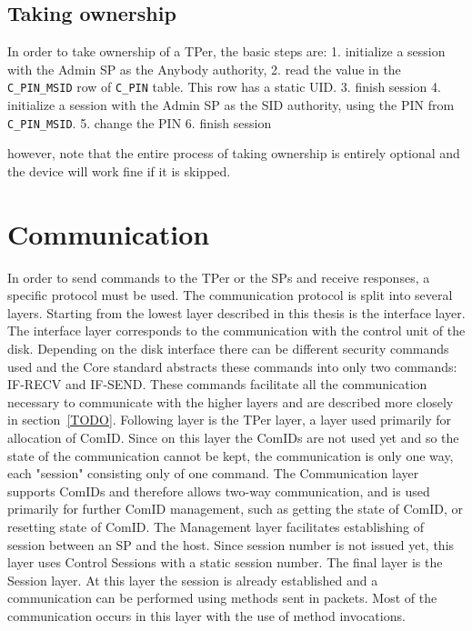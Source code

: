 \subsection{Taking ownership}

In order to take ownership of a TPer, the basic steps are:
1. initialize a session with the Admin SP as the Anybody authority, 
2. read the value in the \verb|C_PIN_MSID| row of \verb|C_PIN| table. This row has a static UID.
3. finish session
4. initialize a session with the Admin SP as the SID authority, using the PIN from \verb|C_PIN_MSID|.
5. change the PIN
6. finish session

however, note that the entire process of taking ownership is entirely optional and the device will work fine if it is skipped.

\section{Communication}

In order to send commands to the TPer or the SPs and receive responses, a specific protocol must be used. %
The communication protocol is split into several layers.
Starting from the lowest layer described in this thesis is the interface layer. The interface layer corresponds to the communication with the control unit of the disk. Depending on the disk interface there can be different security commands used and the Core standard abstracts these commands into only two commands: IF-RECV and IF-SEND. These commands facilitate all the communication necessary to communicate with the higher layers and are described more closely in section~\ref{TODO}.
Following layer is the TPer layer, a layer used primarily for allocation of ComID. Since on this layer the ComIDs are not used yet and so the state of the communication cannot be kept, the communication is only one way, each "session" consisting only of one command.
The Communication layer supports ComIDs and therefore allows two-way communication, and is used primarily for further ComID management, such as getting the state of ComID, or resetting state of ComID.
The Management layer facilitates establishing of session between an SP and the host. Since session number is not issued yet, this layer uses Control Sessions with a static session number.
The final layer is the Session layer. At this layer the session is already established and a communication can be performed using methods sent in packets. Most of the communication occurs in this layer with the use of method invocations.

